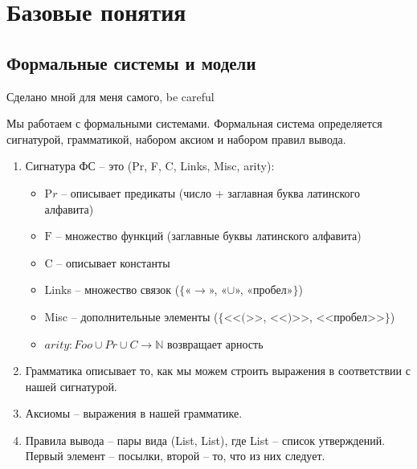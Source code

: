\section{Базовые понятия}
\label{sec-1}
\subsection{Формальные системы и модели}
\label{sec-1-1}
Сделано мной для меня самого, be careful

Мы работаем с формальными системами.
Формальная система определяется сигнатурой, грамматикой,
набором аксиом и набором правил вывода.
\begin{enumerate}
\item Сигнатура ФС -- это (Pr, F, C, Links, Misc, arity):
\begin{itemize}
\item $\mathrm Pr$ -- описывает предикаты (число + заглавная буква латинского алфавита)
\item $\mathrm F$ -- множество функций (заглавные буквы латинского алфавита)
\item $\mathrm C$ -- описывает константы
\item Links -- множество связок ($\lbrace$«$\to$», «$\cup$», «пробел»$\rbrace$)
\item Misc -- дополнительные элементы ($\lbrace$<<$($>>, <<$)$>>, <<пробел>>$\rbrace$)
\item $arity\colon Foo \cup Pr \cup C \to \mathbb N$ возвращает арность
\end{itemize}
\item Грамматика описывает то, как мы можем строить выражения
в соответствии с нашей сигнатурой.
\item Аксиомы -- выражения в нашей грамматике.
\item Правила вывода -- пары вида (List, List), где List --
список утверждений. Первый элемент – посылки, второй --
то, что из них следует.
\end{enumerate}

